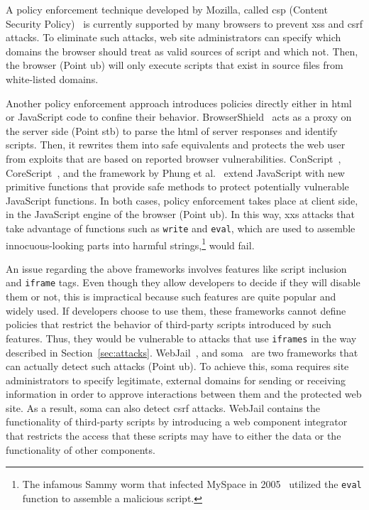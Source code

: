\documentclass[conference]{IEEEtran}
\begin{document}
A policy enforcement technique developed by Mozilla,
called {\sc csp} (Content Security Policy)~\cite{cspMoz,SSM10}
is currently supported by many browsers to prevent
{\sc xss} and {\sc csrf} attacks. To eliminate such
attacks, web site administrators
can specify which domains the browser should treat
as valid sources of script and which not. Then, the browser
(Point {\sc ub}) will only execute scripts that exist in
source files from white-listed domains.

Another policy enforcement approach introduces
policies directly either in {\sc html} or JavaScript code
to confine their behavior. BrowserShield~\cite{RDWDE07}
acts as a proxy on the server side (Point {\sc s}t{\sc b}) to
parse the {\sc html} of server responses and identify
scripts. Then, it rewrites them into safe equivalents
and protects the web user from exploits
that are based on reported browser vulnerabilities.
ConScript~\cite{ML10}, CoreScript~\cite{YCIS07},
and the framework by Phung et al.~\cite{PSC09}
extend JavaScript with new primitive functions that
provide safe methods to protect potentially vulnerable
JavaScript functions. In both cases, policy enforcement takes
place at client side, in the JavaScript engine of the browser (Point {\sc ub}).
In this way, {\sc xxs} attacks that take advantage
of functions such as {\tt write} and {\tt eval}, which are
used to assemble innocuous-looking parts into harmful
strings,\footnote{The infamous Sammy worm that
infected MySpace in 2005~\cite{SP07,ELX07}
utilized the {\tt eval} function to assemble a
malicious script.} would fail.

An issue regarding the above frameworks
involves features like script inclusion
and {\tt iframe} tags. Even though they allow developers
to decide if they will disable them or not,
this is impractical because such features are quite popular and widely used.
If developers choose to use them, these frameworks cannot
define policies that restrict the behavior of third-party
scripts introduced by such features. Thus, they would
be vulnerable to attacks that use {\tt iframes}
in the way described in Section~\ref{sec:attacks}.
WebJail~\cite{VDDPJ11}, and {\sc soma}~\cite{OWVS08}
are two frameworks that can actually detect such attacks (Point {\sc
  ub}). To achieve this, {\sc soma} requires site administrators to
specify legitimate, external domains for sending or receiving
information in order to approve interactions between them and the
protected web site. As a result, {\sc soma} can also detect {\sc csrf}
attacks. WebJail contains the functionality of third-party scripts by
introducing a web component integrator that restricts the access that
these scripts may have to either the data or the functionality of
other components.
\end{document}
